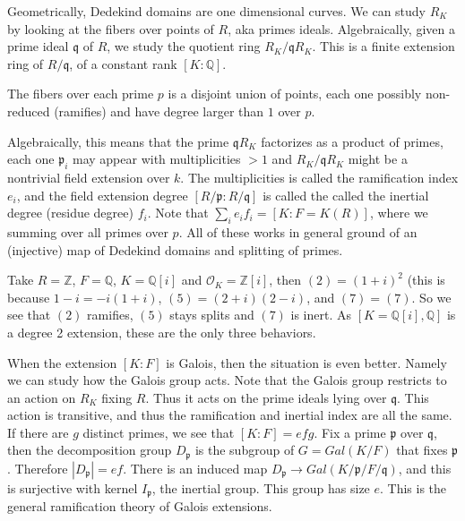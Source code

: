 \documentclass[main.tex]{subfiles}
\begin{document}
 Geometrically, Dedekind domains are one dimensional curves. We can study $R_K$ by looking at the fibers over points of $R$, aka primes ideals. Algebraically, given a prime ideal $\mathfrak{q}$ of $R$, we study the quotient ring $R_K/\mathfrak{q}R_K$. This is a finite extension ring of $R/\mathfrak{q}$, of a constant rank $[K: \mathbb{Q}]$. 

The fibers over each prime $p$ is a disjoint union of points, each one possibly non-reduced (ramifies) and have degree larger than $1$ over $p$.

Algebraically, this means that the prime $\mathfrak{q}R_K$ factorizes as a product of primes, each one $\mathfrak{p}_i$ may appear with multiplicities $ > 1$  and $R_K/\mathfrak{q}R_K$ might be a nontrivial field extension over $k$. The multiplicities is called the ramification index $e_i$, and the field extension degree $[R/\mathfrak{p}: R/\mathfrak{q}] $ is called the called the inertial degree (residue degree) $f_i$. Note that $\sum_i e_i f_i = [K : F = K(R)]$, where we summing over all primes over $p$. All of these works in general ground of an (injective) map of Dedekind domains and splitting of primes.



\begin{example}
Take $R = \mathbb{Z}$, $F = \mathbb{Q}$, $K = \mathbb{Q}[i]$ and $\mathcal{O}_K = \mathbb{Z}[i]$, then $(2) = (1+i)^2$ (this is because $1-i = -i (1 + i)$, $(5) = (2 + i) (2 -i)$, and $(7) = (7)$. So we see that $(2)$ ramifies, $(5)$ stays splits and $(7)$ is inert. As $[K = \mathbb{Q}[i], \mathbb{Q}]$ is a degree 2 extension, these are the only three behaviors.
\end{example}


When the extension $[K: F]$ is Galois, then the situation is even better. Namely we can study how the Galois group acts. Note that the Galois group restricts to an action on $R_K$ fixing $R$. Thus it acts on the prime ideals lying over $\mathfrak{q}$. This action is transitive, and thus the ramification and inertial index are all the same. If there are $g$ distinct primes, we see that $[K:F] = efg$. Fix a prime $\mathfrak{p}$ over $\mathfrak{q}$, then the decomposition group $D_\mathfrak{p}$ is the subgroup of $G = Gal(K/F)$ that fixes $\mathfrak{p}$. Therefore $|D_\mathfrak{p}| = ef$. There is an induced map $D_\mathfrak{p} \rightarrow Gal(K/\mathfrak{p}/F/\mathfrak{q})$, and this is surjective with kernel $I_\mathfrak{p}$, the inertial group. This group has size $e$. This is the general ramification theory of Galois extensions.
\end{document}
